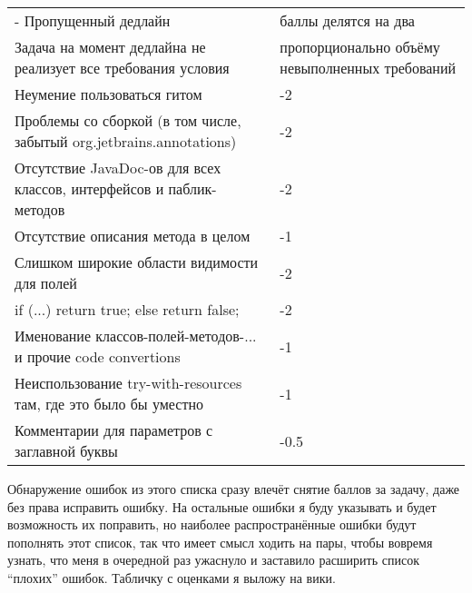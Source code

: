 \documentclass[a5paper]{article}
\begin{document}
\vspace{3mm}
\begin{small}
	\begin{tabu} {| X[1 l p] | X[0.3 l p] |}
		\tabucline-
		\everyrow{\tabucline-}
		Пропущенный дедлайн                                                                   & баллы делятся на два \\
		Задача на момент дедлайна не реализует все требования условия                         & пропорционально объёму невыполненных требований \\
		Неумение пользоваться гитом                                                           & -2 \\
		Проблемы со сборкой (в том числе, забытый org.jetbrains.annotations)                  & -2 \\
		Отсутствие JavaDoc-ов для всех классов, интерфейсов и паблик-методов                  & -2 \\
		Отсутствие описания метода в целом                                                    & -1 \\
		Слишком широкие области видимости для полей                                           & -2 \\
		if (...) return true; else return false;                                              & -2 \\
		Именование классов-полей-методов-... и прочие code convertions                        & -1 \\
		Неиспользование try-with-resources там, где это было бы уместно                       & -1 \\
		Комментарии для параметров с заглавной буквы                                          & -0.5 \\
	\end{tabu}
\end{small}
\vspace{3mm}

Обнаружение ошибок из этого списка сразу влечёт снятие баллов за задачу, даже без права исправить ошибку. На остальные ошибки я буду указывать и будет возможность их поправить, но наиболее распространённые ошибки будут пополнять этот список, так что имеет смысл ходить на пары, чтобы вовремя узнать, что меня в очередной раз ужаснуло и заставило расширить список ``плохих'' ошибок. Табличку с оценками я выложу на вики.
\end{document}
